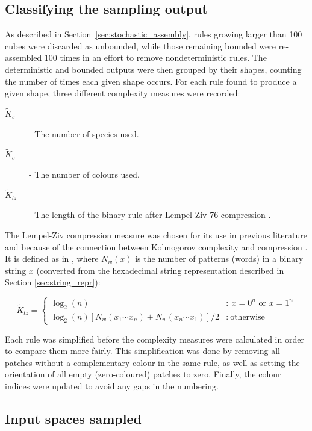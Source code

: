 \subsection{Classifying the sampling output}
As described in Section~\ref{sec:stochastic_assembly}, rules growing larger than 100 cubes were discarded as unbounded, while those remaining bounded were re-assembled 100 times in an effort to remove nondeterministic rules. The deterministic and bounded outputs were then grouped by their shapes, counting the number of times each given shape occurs. For each rule found to produce a given shape, three different complexity measures were recorded:
\begin{description}
    \item[\(\widetilde{K}_s\)] - The number of species used.
    \item[\(\widetilde{K}_c\)] - The number of colours used.
    \item[\(\widetilde{K}_{lz}\)] - The length of the binary rule after Lempel-Ziv 76 compression \cite{lempel-ziv}. 
\end{description}

The Lempel-Ziv compression measure was chosen for its use in previous literature \cite{johnston2021, dingle2018input} and because of the connection between Kolmogorov complexity and compression \cite{johnston2021}. It is defined as in \cite{dingle2018input}, where \(N_w(x)\) is the number of patterns (words) in a binary string \(x\) (converted from the hexadecimal string representation described in Section \ref{sec:string_repr}):

\[
    \widetilde{K}_{lz} = \left\{ \begin{array}{cl}
        \log_2\left( n \right) & : \ x = 0^n \text{ or } x = 1^n \\
        \log_2\left( n \right)\left[ N_w\left( x_1\cdots x_n \right) + N_w\left( x_n\cdots x_1 \right) \right] / 2 & : \ \text{otherwise}
        \end{array} \right.
\]

Each rule was simplified before the complexity measures were calculated in order to compare them more fairly. This simplification was done by removing all patches without a complementary colour in the same rule, as well as setting the orientation of all empty (zero-coloured) patches to zero. Finally, the colour indices were updated to avoid any gaps in the numbering.

\subsection{Input spaces sampled}

